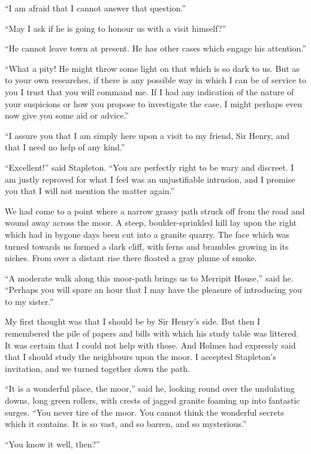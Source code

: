 \documentclass[paper=5.5in:8.5in,BCOR=7mm,twoside,DIV=calc,12pt,usegeometry,openany,chapterprefix,endperiod,headings=big]{scrbook} %
\begin{document}
\enquote{I am afraid that I cannot answer that question.}

\enquote{May I ask if he is going to honour us with a visit himself?}

\enquote{He cannot leave town at present. He has other cases which engage his attention.}

\enquote{What a pity! He might throw some light on that which is so dark to us. But as to your own researches, if there is any possible way in which I can be of service to you I trust that you will command me. If I had any indication of the nature of your suspicions or how you propose to investigate the case, I might perhaps even now give you some aid or advice.}

\enquote{I assure you that I am simply here upon a visit to my friend, Sir Henry, and that I need no help of any kind.}

\enquote{Excellent!} said Stapleton. \enquote{You are perfectly right to be wary and discreet. I am justly reproved for what I feel was an unjustifiable intrusion, and I promise you that I will not mention the matter again.}

We had come to a point where a narrow grassy path struck off from the road and wound away across the moor. A steep, boulder-sprinkled hill lay upon the right which had in bygone days been cut into a granite quarry. The face which was turned towards us formed a dark cliff, with ferns and brambles growing in its niches. From over a distant rise there floated a gray plume of smoke.

\enquote{A moderate walk along this moor-path brings us to Merripit House,} said he. \enquote{Perhaps you will spare an hour that I may have the pleasure of introducing you to my sister.}

My first thought was that I should be by Sir Henry's side. But then I remembered the pile of papers and bills with which his study table was littered. It was certain that I could not help with those. And Holmes had expressly said that I should study the neighbours upon the moor. I accepted Stapleton's invitation, and we turned together down the path.

\enquote{It is a wonderful place, the moor,} said he, looking round over the undulating downs, long green rollers, with crests of jagged granite foaming up into fantastic surges. \enquote{You never tire of the moor. You cannot think the wonderful secrets which it contains. It is so vast, and so barren, and so mysterious.}

\enquote{You know it well, then?}
\end{document}
